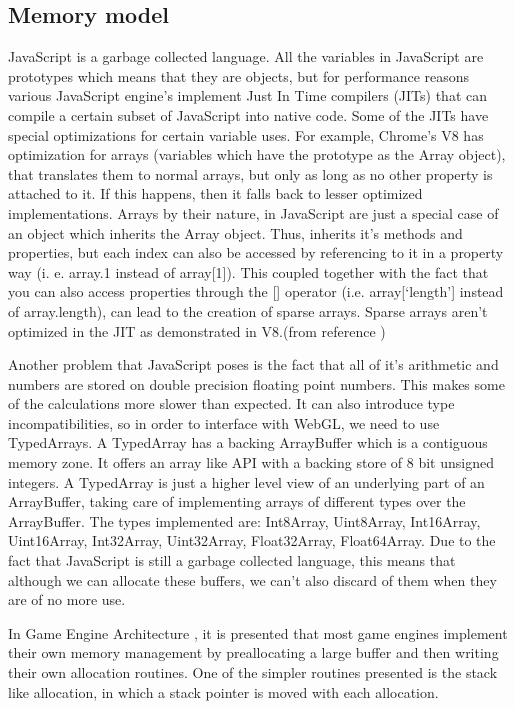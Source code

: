 \subsection{Memory model}

JavaScript is a garbage collected language. All the variables in JavaScript are prototypes which means that they are objects, but for performance reasons various JavaScript engine’s implement Just In Time compilers (JITs) that can compile a certain subset of JavaScript into native code. Some of the JITs have special optimizations for certain variable uses. For example, Chrome’s V8 has optimization for arrays (variables which have the prototype as the Array object), that translates them to normal arrays, but only as long as no other property is attached to it. If this happens, then it falls back to lesser optimized implementations. Arrays by their nature, in JavaScript are just a special case of an object which inherits the Array object. Thus, inherits it’s methods and properties, but each index can also be accessed by referencing to it in a property way (i. e. array.1 instead of array[1]). This coupled together with the fact that you can also access properties through the [] operator (i.e. array[‘length’] instead of array.length), can lead to the creation of sparse arrays. Sparse arrays aren’t optimized in the JIT as demonstrated in V8.(from reference \cite{clifford12})

Another problem that JavaScript poses is the fact that all of it’s arithmetic and numbers are stored on double precision floating point numbers. This makes some of the calculations more slower than expected. It can also introduce type incompatibilities, so in order to interface with WebGL, we need to use TypedArrays. A TypedArray has a backing ArrayBuffer which is a contiguous memory zone. It offers an array like API with a backing store of 8 bit unsigned integers. A TypedArray is just a higher level view of an underlying part of an ArrayBuffer, taking care of implementing arrays of different types over the ArrayBuffer. The types implemented are: Int8Array, Uint8Array, Int16Array, Uint16Array, Int32Array, Uint32Array, Float32Array, Float64Array. Due to the fact that  JavaScript is still a garbage collected language, this means that although we can allocate these buffers, we can’t also discard of them when they are of no more use.

In Game Engine Architecture \cite{gregory09}, it is presented that most game engines implement their own memory management by preallocating a large buffer and then writing their own allocation routines. One of the simpler routines presented is the stack like allocation, in which a stack pointer is moved with each allocation.

